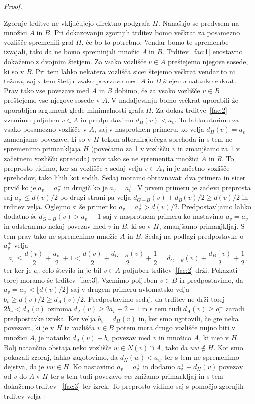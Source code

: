 \documentclass[12pt,a4paper,twoside]{article}
\theoremstyle{definition} %
\theoremstyle{plain} %
\numberwithin{equation}{section}  %
\begin{document}
\begin{proof}
\begin{enumerate}
\end{enumerate}
Zgornje trditve ne vključujejo direktno podgrafa $H$. Nanašajo se predvsem na množici $A$ in $B$. Pri dokazovanju zgornjih trditev bomo večkrat za posamezno vozlišče spremenili graf $H$, če bo to potrebno. Vendar bomo te spremembe izvajali, tako da ne bomo spreminjali množic $A$ in $B$.
Trditev~\ref{fac:1} enostavno dokažemo z dvojnim štetjem. Za vsako vozlišče $v \in A$ preštejemo njegove sosede, ki so v $B$. Pri tem lahko nekatera vozlišča sicer štejemo večkrat vendar to ni težava, saj v tem štetju vsako povezavo med $A$ in $B$ štejemo natanko enkrat. Prav tako vse povezave med $A$ in $B$ dobimo, če za vsako vozlišče $v \in B$ preštejemo vse njegove sosede v $A$. V nadaljevanju bomo večkrat uporabili že uporabljen argument glede minimalnosti grafa $H$.
Za dokaz trditve~\ref{fac:2} vzemimo poljuben $v \in A$ in predpostavimo $d_H(v) < a_v$. To lahko storimo za vsako posamezno vozlišče v $A$, saj v nasprotnem primeru, ko velja $d_H(v) = a_v$ zamenjamo povezave, ki so v $H$ tekom alternirajočega sprehoda in s tem ne spremenimo primankljaja $H$ (povečamo za 1 v vozlišču $v$ in zmanjšamo za 1 v začetnem vozlišču sprehoda) prav tako se ne spremenita množici $A$ in $B$. To preprosto vidimo, ker za vozlišče $v$ sedaj velja $v \in A_0$ in je začetno vozlišče sprehodov, tako lihih kot sodih. Sedaj moramo obravnavati dva primera in sicer prvič ko je $a_v = a_v^-$ in drugič ko je $a_v = a_v^+$. V prvem primeru je zadeva preprosta saj $a_v^- \le d(v)/2$ po drugi strani pa velja $d_{G-B}(v) + d_B(v)/2 \ge d(v)/2$ in trditev velja. Oglejmo si še primer ko $a_v = a_v^+ > d(v)/2$. Predpostavljamo lahko dodatno še $d_ {G-B}(v) > a_v^- + 1$ saj v nasprotnem primeru ko nastavimo $a_v = a_v^-$ in odstranimo nekaj povezav med $v$ in $B$, ki so v $H$, zmanjšamo primanjkljaj. S tem prav tako ne spremenimo množic $A$ in $B$. Sedaj na podlagi predpostavke o $a_v^+$ velja
$$a_v \le \frac{d(v)}{2} + \frac{a_v^-}{2} + 1 < \frac{d(v)}{2} + \frac{d_{G-B}(v)}{2} + \frac{1}{2} = d_{G-B}(v) + \frac{d_B(v)}{2} + \frac{1}{2}, $$
ter ker je $a_v$ celo število in je bil $v \in A$ poljuben trditev~\ref{fac:2} drži. Pokazati torej moramo še trditev~\ref{fac:3}. Vzemimo poljuben $v \in B$ in predpostavimo, da $a_v = a_v^- < \lfloor d(v)/2 \rfloor$ saj v drugem primeru avtomatsko velja $b_v \ge d(v)/2 \ge d_A(v)/2$. Predpostavimo sedaj, da trditev ne drži torej $2b_v < d_A(v)$ oziroma $d_A(v) \ge 2a_v + 2 + 1$ in s tem tudi $d_A(v) \ge a_v^+$ zaradi predpostavke izreka. Ker velja $b_v = d_H(v)$ in, ker smo ugotovili, če gre neka povezava, ki je v $H$ iz vozlišča $v \in B$ potem mora drugo vozlišče nujno biti v množici $A$, je natanko $d_A(v) - b_v$ povezav med $v$ in množico $A$, ki niso v $H$. Bolj natančno obstaja neko vozlišče $w \in N(v) \cap A$, tako da $uw \notin H$. Kot smo pokazali zgoraj, lahko zagotovimo, da $d_H(w) < a_w$ ter s tem ne spremenimo dejstva, da je $vw \in H$. Ko nastavimo $a_v = a_v^+$ in dodamo $a_v^+ - d_H(v)$ povezav od $v$ do $A$ v $H$ ter s tem tudi povezavo $vw$ znižamo primankljaj in s tem dokažemo trditev ~\ref{fac:3} ter izrek. To preprosto vidimo saj s pomočjo zgornjih trditev velja

\end{proof}
\end{document}
